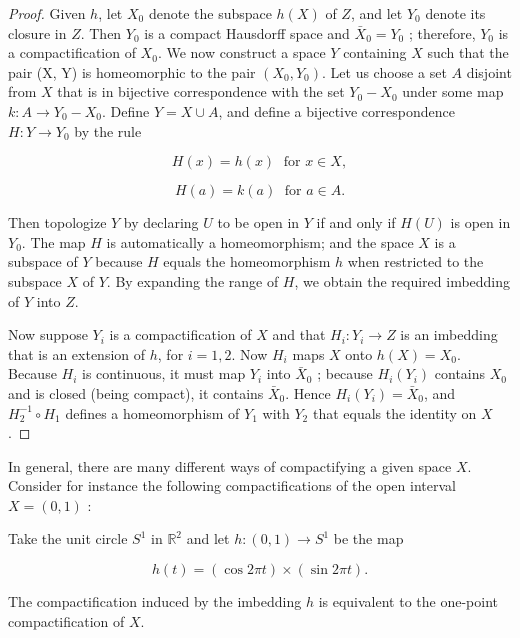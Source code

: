 \begin{proof}
 Given \(h\), let \(X_{0}\) denote the subspace \(h(X)\) of \(Z\), and let \(Y_{0}\) denote its closure in \(Z\). Then \(Y_{0}\) is a compact Hausdorff space and \(\bar{X}_{0} = Y_{0}\) ; therefore, \(Y_{0}\) is a compactification of \(X_{0}\).
We now construct a space \(Y\) containing \(X\) such that the pair (X, Y) is homeomorphic to the pair \(( {X_{0},Y_{0}})\). Let us choose a set \(A\) disjoint from \(X\) that is in bijective correspondence with the set \(Y_{0} - X_{0}\) under some map \(k : A \rightarrow {Y}_{0} - X_{0}\). Define \(Y = X \cup A\), and define a bijective correspondence \(H : Y \rightarrow {Y}_{0}\) by the rule

\[
H(x) = h(x) \;\text{ for }x \in X,
\]

\[
H(a) = k(a) \;\text{ for }a \in A.
\]

Then topologize \(Y\) by declaring \(U\) to be open in \(Y\) if and only if \(H( U)\) is open in \(Y_{0}\). The map \(H\) is automatically a homeomorphism; and the space \(X\) is a subspace of \(Y\) because \(H\) equals the homeomorphism \(h\) when restricted to the subspace \(X\) of \(Y\). By expanding the range of \(H\), we obtain the required imbedding of \(Y\) into \(Z\).

Now suppose \(Y_{i}\) is a compactification of \(X\) and that \(H_{i} : Y_{i} \rightarrow Z\) is an imbedding that is an extension of \(h\), for \(i = 1,2\). Now \(H_{i}\) maps \(X\) onto \(h(X) = X_{0}\). Because \(H_{i}\) is continuous, it must map \(Y_{i}\) into \(\bar{X}_{0}\) ; because \(H_{i}( Y_{i})\) contains \(X_{0}\) and is closed (being compact), it contains \(\bar{X}_{0}\). Hence \(H_{i}( Y_{i}) = \bar{X}_{0}\), and \(H_2^{-1} \circ {H}_{1}\) defines a homeomorphism of \(Y_{1}\) with \(Y_{2}\) that equals the identity on \(X\).
\end{proof}

In general, there are many different ways of compactifying a given space \(X\). Consider for instance the following compactifications of the open interval \(X = ( {0,1})\) :

\begin{centeredblock}
\begin{example}
\label{ex:\thesection.\theexample}
 Take the unit circle \(S^{1}\) in \(\mathbb{R}^{2}\) and let \(h : ( {0,1}) \rightarrow {S}^{1}\) be the map

\[
h(t) = ( {\cos {2\pi t}}) \times ( {\sin {2\pi t}}).
\]

The compactification induced by the imbedding \(h\) is equivalent to the one-point compactification of \(X\).
\end{example}
\end{centeredblock}


